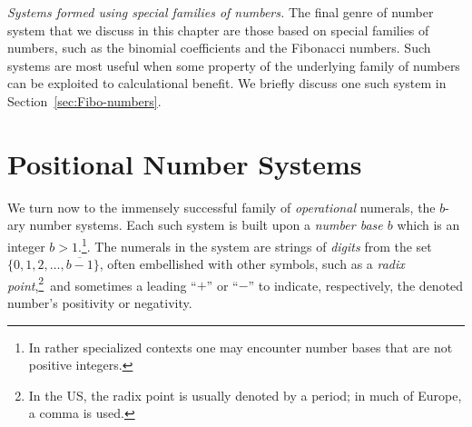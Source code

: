 \medskip


\noindent
{\it Systems formed using special families of numbers.}
The final genre of number system that we discuss in this chapter are those based on special families of numbers, such as the binomial coefficients and the Fibonacci numbers.  Such systems are most useful when some property of the underlying family of numbers can be exploited to calculational benefit.  We briefly discuss one such system in Section~\ref{sec:Fibo-numbers}.


\section{Positional Number Systems}
\label{sec:positional-numbers}

We turn now to the immensely successful family of {\em operational} numerals, the $b$-ary number systems.  Each such system is built upon a {\em number base $b$} which is an integer $b> 1$.\footnote{In rather specialized contexts one may encounter number bases that are not positive integers.}.  The numerals in the system are strings of {\it digits} from the set
$\{0, 1, 2, \ldots, \overline{b-1}\}$, often embellished with other symbols, such as a {\em radix point},\footnote{In the US, the radix point is usually denoted by a period; in much of Europe, a comma is used.}~and sometimes a leading ``$+$'' or ``$-$'' to indicate, respectively, the denoted number's positivity or negativity.

\medskip


\noindent {}

\medskip

